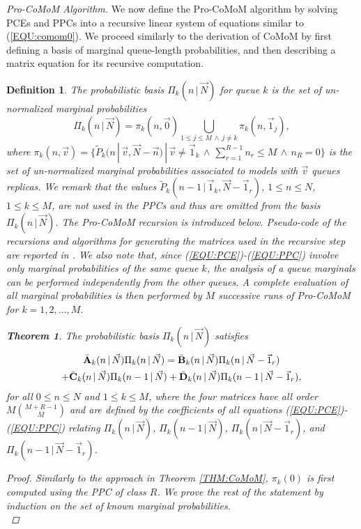 \documentclass[journal,twocolumn,9.5pt]{IEEEtran}
\newtheorem{theorem}{Theorem}
\newtheorem{definition}{Definition}
\newcommand{\comom}[1]{\bar{#1}}
\begin{document}
{\em Pro-CoMoM Algorithm.} We now define the Pro-CoMoM algorithm by solving PCEs and PPCs into a recursive linear system of equations similar to (\ref{EQU:comom0}). We proceed similarly to the derivation of CoMoM by first defining a basis of marginal queue-length probabilities, and then describing a matrix equation for its recursive computation.
\begin{definition} {\em The {\em probabilistic basis} $\Pi_k(n\,|\,\vec N)$ for queue $k$  is the set of un-normalized marginal probabilities
\begin{equation}
\Pi_k(n\,|\,\vec N)=\pi_k(n,\vec 0) \bigcup_{1\leq j\leq M\,\wedge\,j\neq k} \pi_k(n,\vec 1_j),
\end{equation}
where $\pi_k(n,\vec v)=\{\widetilde{P}_k(n\,|\,\vec v,\vec N- \vec n) \,|\, \vec v\neq \vec 1_k \,\wedge\, \sum_{r=1}^{R-1} n_r \leq M \,\wedge\, n_R=0\}$ is the set of un-normalized marginal probabilities associated to models with
$\vec v$ queues replicas.
}
We remark that the values $\widetilde{P}_k(n-1\,|\, \vec 1_k, \vec N-\vec 1_r)$, $1\leq n \leq N$, $1\leq k\leq M$, are not used in the PPCs and thus are omitted from the basis $\Pi_k(n\,|\,\vec N)$. The Pro-CoMoM recursion is introduced below. Pseudo-code of the recursions and algorithms for generating the matrices used in the recursive step are reported in \cite{TR}. We also note that, since (\ref{EQU:PCE})-(\ref{EQU:PPC}) involve only marginal probabilities of the same queue $k$, the analysis of a queue marginals can be performed independently from the other queues. A complete evaluation of all marginal probabilities is then performed by $M$ successive runs of Pro-CoMoM for $k=1,2,\ldots,M$.
\begin{theorem} {\em The probabilistic basis $\Pi_k(n\,|\,\vec N)$ satisfies
\begin{multline*}
\comom{\bf A}_k(n\,|\,\vec N) \Pi_k(n\,|\,\vec N)=\comom{\bf B}_k(n\,|\,\vec N)\Pi_k(n\,|\,\vec N-\vec 1_r)\\+\comom{\bf C}_k(n\,|\,\vec N)\Pi_k(n-1\,|\,\vec N)+\comom{\bf D}_k(n\,|\,\vec N)\Pi_k(n-1\,|\,\vec N-\vec 1_r),
\end{multline*}
for all $0\leq n\leq N$ and $1\leq k\leq M$, where the four matrices have all order $M{M+R-1\choose M}$ and are defined by the coefficients of all equations (\ref{EQU:PCE})-(\ref{EQU:PPC}) relating $\Pi_k(n\,|\,\vec N)$, $\Pi_k(n-1\,|\,\vec N)$, $\Pi_k(n\,|\,\vec N-\vec 1_r)$, and $\Pi_k(n-1\,|\,\vec N-\vec 1_r)$.}
\end{theorem}
\begin{proof}Similarly to the approach in Theorem \ref{THM:CoMoM}, $\pi_k(0)$ is first computed using the PPC of class $R$. We prove the rest of the statement by induction on the set of known marginal probabilities. \\

\end{proof}
\end{definition}
\end{document}
